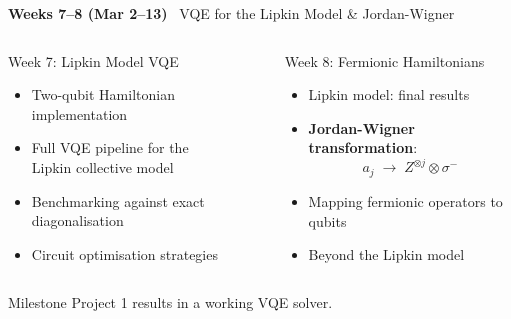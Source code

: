 \documentclass[aspectratio=169,10pt]{beamer}
\newcommand{\week}[1]{\textcolor{blue!60!black}{\textbf{#1}}}
\begin{document}
\begin{frame}{\week{Weeks 7--8 (Mar 2--13)} \ VQE for the Lipkin Model \& Jordan-Wigner}
  \begin{columns}[T]
      \begin{block}{Week 7: Lipkin Model VQE}
        \begin{itemize}
          \item Two-qubit Hamiltonian implementation
          \item Full VQE pipeline for the\\
                Lipkin collective model
          \item Benchmarking against exact diagonalisation
          \item Circuit optimisation strategies
        \end{itemize}
      \end{block}
      \begin{block}{Week 8: Fermionic Hamiltonians}
        \begin{itemize}
          \item Lipkin model: final results
          \item \textbf{Jordan-Wigner transformation}:
                \[
                  a_j \;\rightarrow\; Z^{\otimes j}\otimes\sigma^-
                \]
          \item Mapping fermionic operators to qubits
          \item Beyond the Lipkin model
        \end{itemize}
      \end{block}
  \end{columns}
  \vspace{4pt}
  \begin{alertblock}{Milestone}
    Project 1 results in a working VQE solver.
  \end{alertblock}
\end{frame}
\end{document}
